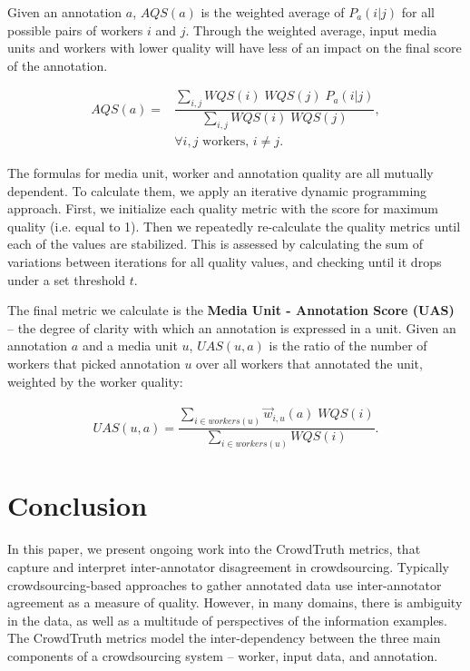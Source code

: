 Given an annotation $a$, $AQS(a)$ is the weighted average of $P_a(i | j)$ for all possible pairs of workers $i$ and $j$. Through the weighted average, input media units and workers with lower quality will have less of an impact on the final score of the annotation.

\begin{align}
AQS(a) = & \dfrac{ \sum\limits_{i,j} WQS(i) \; WQS(j) \; P_a(i | j) }{ \sum\limits_{i,j} WQS(i) \; WQS(j) }, \\
& \forall i, j \text{ workers, }  i \neq j . \nonumber
\end{align}

The formulas for media unit, worker and annotation quality are all mutually dependent. To calculate them, we apply an iterative dynamic programming approach. First, we initialize each quality metric with the score for maximum quality (i.e. equal to 1). Then we repeatedly re-calculate the quality metrics until each of the values are stabilized. This is assessed by calculating the sum of variations between iterations for all quality values, and checking until it drops under a set threshold $t$.

The final metric we calculate is the \textbf{Media Unit - Annotation Score (UAS)} -- the degree of clarity with which an annotation is expressed in a unit. Given an annotation $a$ and a media unit $u$, $UAS(u, a)$ is the ratio of the number of workers that picked annotation $u$ over all workers that annotated the unit, weighted by the worker quality:

\begin{align}
UAS(u, a) = \dfrac{ \sum\limits_{i \in workers(u)} \vec{w}_{i,u}(a) \; WQS(i) }{ \sum\limits_{i \in workers(u)} WQS(i) }.
\end{align}


\section{Conclusion}

In this paper, we present ongoing work into the CrowdTruth metrics, that capture and interpret inter-annotator disagreement in crowdsourcing. Typically crowdsourcing-based approaches to gather annotated data use inter-annotator agreement as a measure of quality. However, in many domains, there is ambiguity in the data, as well as a multitude of perspectives of the information examples. The CrowdTruth metrics model the inter-dependency between the three main components of a crowdsourcing system -- worker, input data, and annotation.

